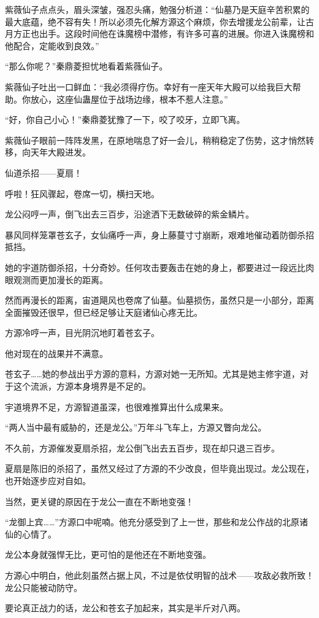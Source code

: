 \begin{this_body}
紫薇仙子点点头，眉头深皱，强忍头痛，勉强分析道：“仙墓乃是天庭辛苦积累的最大底蕴，绝不容有失！所以必须先化解方源这个麻烦，你去增援龙公前辈，让古月方正也出手。这段时间他在诛魔榜中潜修，有许多可喜的进展。你进入诛魔榜和他配合，定能收到良效。”

“那么你呢？”秦鼎菱担忧地看着紫薇仙子。

紫薇仙子吐出一口鲜血：“我必须得疗伤。幸好有一座天年大殿可以给我巨大帮助。你放心，这座仙蛊屋位于战场边缘，根本不惹人注意。”

“好，你自己小心！”秦鼎菱犹豫了一下，咬了咬牙，立即飞离。

紫薇仙子眼前一阵阵发黑，在原地喘息了好一会儿，稍稍稳定了伤势，这才悄然转移，向天年大殿进发。

仙道杀招——夏扇！

呼啦！狂风骤起，卷席一切，横扫天地。

龙公闷哼一声，倒飞出去三百步，沿途洒下无数破碎的紫金鳞片。

暴风同样笼罩苍玄子，女仙痛呼一声，身上藤蔓寸寸崩断，艰难地催动着防御杀招抵挡。

她的宇道防御杀招，十分奇妙。任何攻击要轰击在她的身上，都要进过一段远比肉眼观测而更加漫长的距离。

然而再漫长的距离，宙道飓风也卷席了仙墓。仙墓损伤，虽然只是一小部分，距离全面摧毁还很早，但已经足够让天庭诸仙心疼无比。

方源冷哼一声，目光阴沉地盯着苍玄子。

他对现在的战果并不满意。

苍玄子……她的参战出乎方源的意料，方源对她一无所知。尤其是她主修宇道，对于这个流派，方源本身境界是不足的。

宇道境界不足，方源智道虽深，也很难推算出什么成果来。

“两人当中最有威胁的，还是龙公。”万年斗飞车上，方源又瞥向龙公。

不久前，方源催发夏扇杀招，龙公倒飞出去五百步，现在却只退三百步。

夏扇是陈旧的杀招了，虽然又经过了方源的不少改良，但毕竟出现过。龙公现在，也开始逐步应对自如。

当然，更关键的原因在于龙公一直在不断地变强！

“龙御上宾……”方源口中呢喃。他充分感受到了上一世，那些和龙公作战的北原诸仙的心情了。

龙公本身就强悍无比，更可怕的是他还在不断地变强。

方源心中明白，他此刻虽然占据上风，不过是依仗明智的战术——攻敌必救所致！龙公只能被动防守。

要论真正战力的话，龙公和苍玄子加起来，其实是半斤对八两。


\end{this_body}

